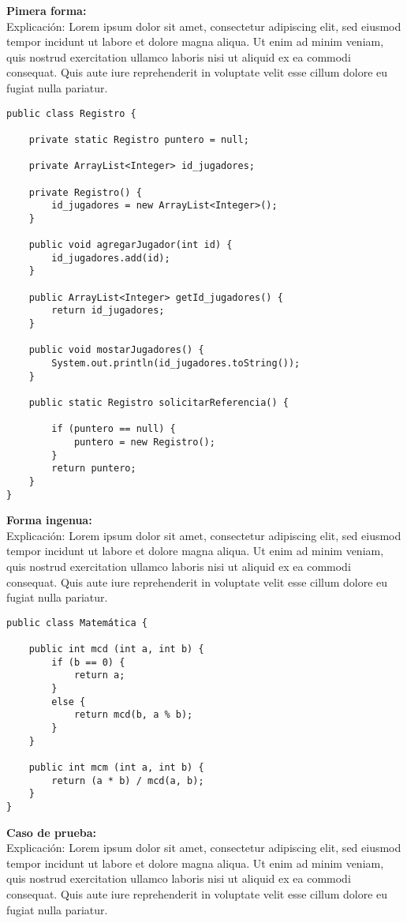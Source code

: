 \documentclass[12pt]{book}
\begin{document}
\textbf{Pimera forma:} \\
Explicación: Lorem ipsum dolor sit amet, consectetur adipiscing elit, sed eiusmod tempor incidunt ut labore et dolore magna aliqua. Ut enim ad minim veniam, quis nostrud exercitation ullamco laboris nisi ut aliquid ex ea commodi consequat. Quis aute iure reprehenderit in voluptate velit esse cillum dolore eu fugiat nulla pariatur.

\begin{verbatim}
public class Registro {
	
    private static Registro puntero = null;
    
    private ArrayList<Integer> id_jugadores;
    
    private Registro() {
        id_jugadores = new ArrayList<Integer>();
    }
    
    public void agregarJugador(int id) {
        id_jugadores.add(id);
    }
    
    public ArrayList<Integer> getId_jugadores() {
        return id_jugadores;
    }
    
    public void mostarJugadores() {
        System.out.println(id_jugadores.toString());
    }
    
    public static Registro solicitarReferencia() {

        if (puntero == null) {
            puntero = new Registro();
        }   
        return puntero;
    }
}
\end{verbatim}

\textbf{Forma ingenua:} \\
Explicación: Lorem ipsum dolor sit amet, consectetur adipiscing elit, sed eiusmod tempor incidunt ut labore et dolore magna aliqua. Ut enim ad minim veniam, quis nostrud exercitation ullamco laboris nisi ut aliquid ex ea commodi consequat. Quis aute iure reprehenderit in voluptate velit esse cillum dolore eu fugiat nulla pariatur.

\begin{verbatim}
public class Matemática {
	
    public int mcd (int a, int b) {
        if (b == 0) {
            return a;
        }
        else {
            return mcd(b, a % b);
        }
    }
    
    public int mcm (int a, int b) {
        return (a * b) / mcd(a, b);
    }
}
\end{verbatim}

\newpage

\textbf{Caso de prueba:} \\
Explicación: Lorem ipsum dolor sit amet, consectetur adipiscing elit, sed eiusmod tempor incidunt ut labore et dolore magna aliqua. Ut enim ad minim veniam, quis nostrud exercitation ullamco laboris nisi ut aliquid ex ea commodi consequat. Quis aute iure reprehenderit in voluptate velit esse cillum dolore eu fugiat nulla pariatur.
\end{document}
